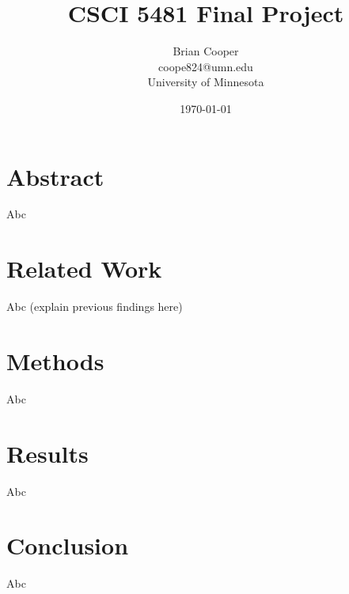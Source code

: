 \documentclass{article}
\title{CSCI 5481 Final Project}
\author{Brian Cooper \\ coope824@umn.edu \\ University of Minnesota}
\date{\today}
\begin{document}
\maketitle

\section{Abstract}
  Abc

\section{Related Work}
  Abc (explain previous findings here)

\section{Methods}
  Abc

\section{Results}
  Abc

\section{Conclusion}
  Abc
\end{document}
